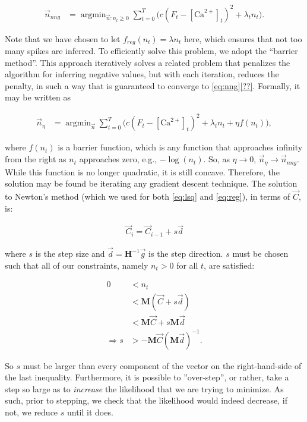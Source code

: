 \documentclass[12pt]{article}
\providecommand{\ve}[1]{\vec{#1}}
\providecommand{\ma}[1]{\boldsymbol{#1}}
\providecommand{\ve}[1]{\boldsymbol{#1}}
\DeclareMathOperator*{\argmin}{argmin}
\newcommand{\Ca}{[\text{Ca}^{2+}]}
\newcommand{\Cav}{\ve{C}}%
\begin{document}
\begin{align} \label{eq:nng}
\ve{n}_{nng} &= \argmin_{\ve{n}: n_t \geq 0} \sum_{t=0}^T \big(c(F_t - \Ca_t)^2 +  \lambda_t n_t\big).
\end{align}

\noindent Note that we have chosen to let $f_{reg}(n_t)=\lambda n_t$ here, which ensures that not too many spikes are inferred. To efficiently solve this problem, we adopt the ``barrier method''.  This approach iteratively solves a related problem that penalizes the algorithm for inferring negative values, but with each iteration, reduces the penalty, in such a way that is guaranteed to converge to \eqref{eq:nng}\ref{??}.  Formally, it may be written as

\begin{align} \label{eq:b}
\ve{n}_{\eta} &= \argmin_{\ve{n}} \sum_{t=0}^T \big(c(F_t - \Ca_t)^2  + \lambda_t n_t + \eta f(n_t)\big),
\end{align}

\noindent where $f(n_t)$ is a barrier function, which is any function that approaches infinity from the right as $n_t$ approaches zero, e.g., $-\log(n_t)$.  So, as $\eta \rightarrow 0$, $\ve{n}_{\eta} \rightarrow \ve{n}_{nng}$. While this function is no longer quadratic, it is still concave. Therefore, the solution may be found be iterating any gradient descent technique.  The solution to Newton's method (which we used for both \eqref{eq:lsq} and \eqref{eq:reg}), in terms of $\Cav$, is:

\begin{align} \label{eq:newton}
\Cav_i = \Cav_{i-1} + s \ve{d}
\end{align}

\noindent where $s$ is the step size and $\ve{d}=\ma{H}^{-1}\ve{g}$ is the step direction.  $s$ must be chosen such that all of our constraints, namely $n_t>0$ for all $t$, are satisfied:

\begin{align}
0&< n_t\\
&< \ma{M}(\ve{C} + s \ve{d})\\
&< \ma{M} \ve{C} + s \ma{M} \ve{d}\\
\Rightarrow s &> -\ma{M}\ve{C} (\ma{M} \ve{d})^{-1}. \label{eq:s}
\end{align}

So $s$ must be larger than every component of the vector on the right-hand-side of the last inequality.  Furthermore, it is possible to ''over-step'', or rather, take a step so large as to \emph{increase} the likelihood that we are trying to minimize.  As such, prior to stepping, we check that the likelihood would indeed decrease, if not, we reduce $s$ until it does. 
\end{document}
